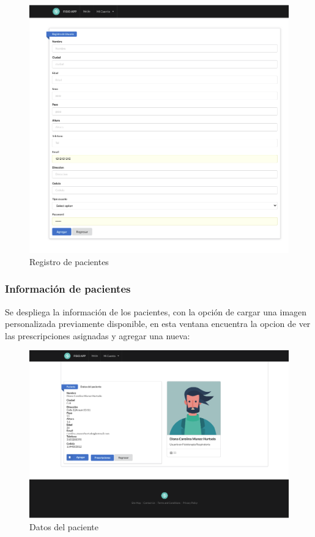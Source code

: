 \documentclass[12pt]{article}
\begin{document}
\begin{figure}[ht]
\centering
\includegraphics[scale=0.5]{imag/appregistrousuario.png}
\caption{Registro de pacientes}
\label{6}
\end{figure}
\FloatBarrier

\subsubsection{Información de pacientes}

Se despliega la información de los pacientes, con la opción de cargar una imagen personalizada previamente disponible, en esta ventana encuentra la opcion de ver las prescripciones asignadas y agregar una nueva:


\begin{figure}[ht]
\centering
\includegraphics[scale=0.3]{imag/appverdatosusuarios2.png}
\caption{Datos del paciente}
\label{6}
\end{figure}
\FloatBarrier
\end{document}
